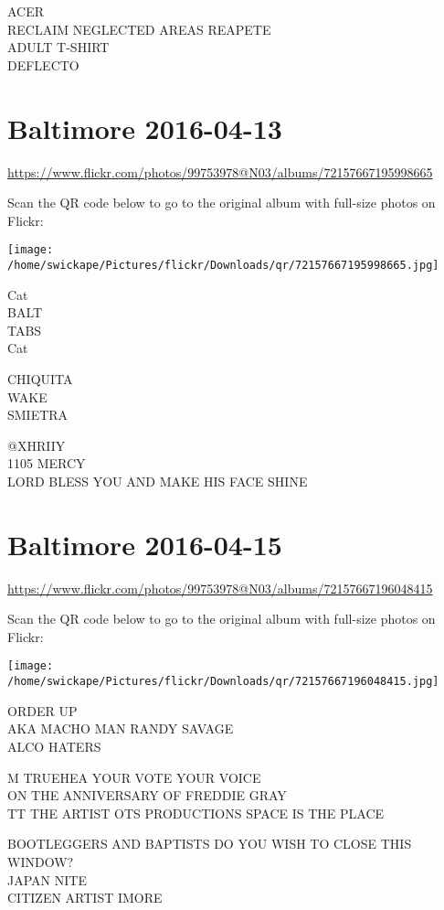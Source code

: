 \documentclass[10pt,letterpaper]{article}
\begin{document}
ACER\\
RECLAIM NEGLECTED AREAS REAPETE\\
ADULT T{-}SHIRT\\
DEFLECTO
\pagebreak

\section*{Baltimore 2016-04-13}

\url{https://www.flickr.com/photos/99753978@N03/albums/72157667195998665}

Scan the QR code below to go to the original album with full-size photos on Flickr:

\texttt{[image: /home/swickape/Pictures/flickr/Downloads/qr/72157667195998665.jpg]}
\pagebreak

Cat\\
BALT\\
TABS\\
Cat

CHIQUITA\\
WAKE\\
SMIETRA

@XHRIIY\\
1105 MERCY\\
LORD BLESS YOU AND MAKE HIS FACE SHINE
\pagebreak

\section*{Baltimore 2016-04-15}

\url{https://www.flickr.com/photos/99753978@N03/albums/72157667196048415}

Scan the QR code below to go to the original album with full-size photos on Flickr:

\texttt{[image: /home/swickape/Pictures/flickr/Downloads/qr/72157667196048415.jpg]}
\pagebreak

ORDER UP\\
AKA MACHO MAN RANDY SAVAGE\\
ALCO HATERS

M TRUEHEA YOUR VOTE YOUR VOICE\\
ON THE ANNIVERSARY OF FREDDIE GRAY\\
TT THE ARTIST OTS PRODUCTIONS SPACE IS THE PLACE

BOOTLEGGERS AND BAPTISTS DO YOU WISH TO CLOSE THIS WINDOW?\\
JAPAN NITE\\
CITIZEN ARTIST IMORE
\end{document}
